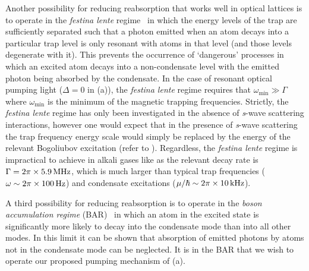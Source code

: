 Another possibility for reducing reabsorption that works well in optical lattices is to operate in the \emph{festina lente} regime~\citep{Wolf:2000,Santos:1999qf,Cirac:1996,Castin:1998} in which the energy levels of the trap are sufficiently separated such that a photon emitted when an atom decays into a particular trap level is only resonant with atoms in that level (and those levels degenerate with it).  This prevents the occurrence of `dangerous' processes in which an excited atom decays into a non-condensate level with the emitted photon being absorbed by the condensate.  In the case of resonant optical pumping light ($\Delta = 0$ in (a)), the \emph{festina lente} regime requires that $\omega_\text{min} \gg \Gamma$  where $\omega_\text{min}$ is the minimum of the magnetic trapping frequencies.  Strictly, the \emph{festina lente} regime has only been investigated in the absence of \emph{s}-wave scattering interactions, however one would expect that in the presence of \emph{s}-wave scattering the trap frequency energy scale would simply be replaced by the energy of the relevant Bogoliubov excitation (refer to ).  Regardless, the \emph{festina lente} regime is impractical to achieve in alkali gases like  as the relevant decay rate is $\Gamma = \unit[2\pi\times 5.9]{MHz}$, which is much larger than typical trap frequencies ($\omega \sim \unit[2\pi \times 100]{Hz}$) and condensate excitations ($\mu/\hbar \sim \unit[2\pi \times 10]{kHz}$).

A third possibility for reducing reabsorption is to operate in the \emph{boson accumulation regime} (BAR)~\citep{Cirac:1996rr,Floegel:2001} in which an atom in the excited state is significantly more likely to decay into the condensate mode than into all other modes.  In this limit it can be shown that absorption of emitted photons by atoms not in the condensate mode can be neglected.  It is in the BAR that we wish to operate our proposed pumping mechanism of (a).  

